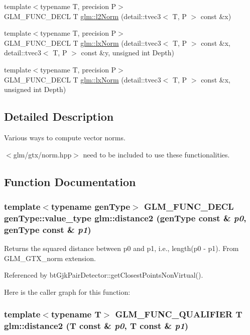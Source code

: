 \begin{CompactItemize}
\item 
{\footnotesize template$<$typename T, precision P$>$ }\\GLM\_\-FUNC\_\-DECL T \hyperlink{group__gtx__norm_g17bb46915f9694cbae612a7bae4c5116}{glm::l2Norm} (detail::tvec3$<$ T, P $>$ const \&x)
\item 
{\footnotesize template$<$typename T, precision P$>$ }\\GLM\_\-FUNC\_\-DECL T \hyperlink{group__gtx__norm_g2f42190c8743abab279d0a8f5a321692}{glm::lxNorm} (detail::tvec3$<$ T, P $>$ const \&x, detail::tvec3$<$ T, P $>$ const \&y, unsigned int Depth)
\item 
{\footnotesize template$<$typename T, precision P$>$ }\\GLM\_\-FUNC\_\-DECL T \hyperlink{group__gtx__norm_g955869c61ab902e4e3cf061303efdaef}{glm::lxNorm} (detail::tvec3$<$ T, P $>$ const \&x, unsigned int Depth)
\end{CompactItemize}


\subsection{Detailed Description}
Various ways to compute vector norms. 

$<$glm/gtx/norm.hpp$>$ need to be included to use these functionalities. 

\subsection{Function Documentation}
\hypertarget{group__gtx__norm_g205e08f24b9e35f9f892b563f2b8dd94}{
\subsubsection[distance2]{\setlength{\rightskip}{0pt plus 5cm}template$<$typename genType$>$ GLM\_\-FUNC\_\-DECL genType::value\_\-type glm::distance2 (genType const \& {\em p0}, \/  genType const \& {\em p1})}}
\label{group__gtx__norm_g205e08f24b9e35f9f892b563f2b8dd94}


Returns the squared distance between p0 and p1, i.e., length(p0 - p1). From GLM\_\-GTX\_\-norm extension. 

Referenced by btGjkPairDetector::getClosestPointsNonVirtual().

Here is the caller graph for this function:\hypertarget{group__gtx__norm_gaf6befa643aa9616f3c19e5548b11b54}{
\subsubsection[distance2]{\setlength{\rightskip}{0pt plus 5cm}template$<$typename T$>$ GLM\_\-FUNC\_\-QUALIFIER T glm::distance2 (T const \& {\em p0}, \/  T const \& {\em p1})}}
\label{group__gtx__norm_gaf6befa643aa9616f3c19e5548b11b54}



